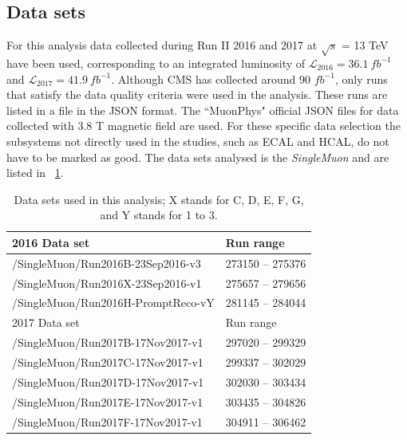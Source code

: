 \subsection{Data sets}
For this analysis data collected during Run II 2016 and 2017 at $\sqrt{s}$ = 13 TeV have been used, corresponding to an integrated luminosity of $\mathcal{L}_{2016} = 36.1~fb^{-1}$ and $\mathcal{L}_{2017} = 41.9~fb^{-1}$. Although CMS has collected around 90 $fb^{-1}$, only runs that satisfy the data quality criteria were used in the analysis. These runs are listed in a file in the JSON format. The ``MuonPhys" official JSON files for data collected with 3.8 T magnetic field are used. For these specific data selection the subsystems not directly used in the studies, such as ECAL and HCAL, do not have to be marked as good. The data sets analysed is the \textit{SingleMuon} and are listed in \tablename~\ref{table:Datasets}. \\
\begin{table}[htb!]
\begin{center}
\begin{tabular}{|l|l|} \hline
2016 Data set                              & Run range        \\ \hline \hline
/SingleMuon/Run2016B-23Sep2016-v3      & 273150 -- 275376 \\ \hline
/SingleMuon/Run2016X-23Sep2016-v1      & 275657 -- 279656 \\ \hline
/SingleMuon/Run2016H-PromptReco-vY     & 281145 -- 284044 \\ \hline \hline
2017 Data set                              & Run range        \\ \hline \hline
/SingleMuon/Run2017B-17Nov2017-v1      & 297020 -- 299329 \\ \hline
/SingleMuon/Run2017C-17Nov2017-v1      & 299337 -- 302029 \\ \hline
/SingleMuon/Run2017D-17Nov2017-v1    & 302030 -- 303434 \\ \hline
/SingleMuon/Run2017E-17Nov2017-v1    & 303435 -- 304826 \\ \hline
/SingleMuon/Run2017F-17Nov2017-v1    & 304911 -- 306462 \\ \hline
\end{tabular}
\caption{Data sets used in this analysis; X stands for C, D, E, F, G, and Y stands for 1 to 3.}
\label{table:Datasets}
\end{center}
\end{table}

